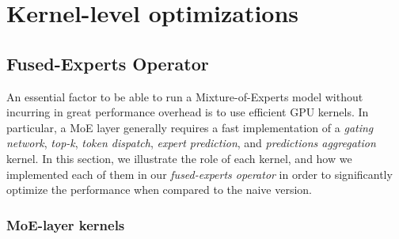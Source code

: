 
\chapter{Kernel-level optimizations}\label{chapter-6}

\section{Fused-Experts Operator}
An essential factor to be able to run a Mixture-of-Experts model without incurring in great performance overhead is to use efficient GPU kernels. In particular, a MoE layer generally requires a fast implementation of a \textit{gating network}, \textit{top-k}, \textit{token dispatch}, \textit{expert prediction}, and \textit{predictions aggregation} kernel. In this section, we illustrate the role of each kernel, and how we implemented each of them in our \textit{fused-experts operator} in order to significantly optimize the performance when compared to the naive version.

\subsection{MoE-layer kernels}

